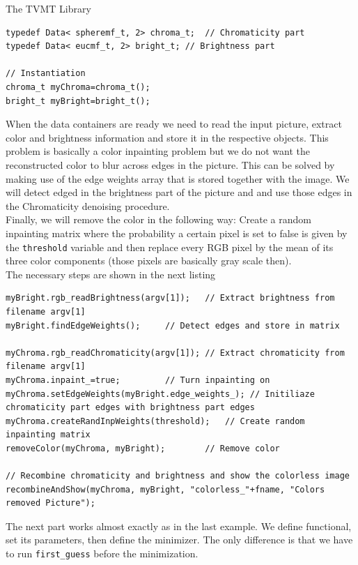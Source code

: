 \begin{chapter}{The TVMT Library}
\begin{lstlisting}[label=code:tut2_mfdata,caption={Manifold and Data class type definitions and instantiation}]
typedef Data< spheremf_t, 2> chroma_t;	// Chromaticity part
typedef Data< eucmf_t, 2> bright_t;	// Brightness part

// Instantiation
chroma_t myChroma=chroma_t();
bright_t myBright=bright_t();
\end{lstlisting}

When the data containers are ready we need to read the input picture, extract color and brightness information and store it in the respective objects.
This problem is basically a color inpainting problem but we do not want the reconstructed color to blur across edges in the picture. This can be solved
by making use of the edge weights array that is stored together with the image. We will detect edged in the brightness part of the picture and and
use those edges in the Chromaticity denoising procedure.\\
Finally, we will remove the color in the following way: Create a random inpainting matrix where the probability a certain pixel is set to false is given
by the \texttt{threshold} variable and then replace every RGB pixel by the mean of its three color components (those pixels are basically gray scale then).\\
The necessary steps are shown in the next listing

\cppinline
\begin{lstlisting}[label=code:tut2_edgeandcolorremoval,caption={Color and brightness input, edge detection and color removal}]
myBright.rgb_readBrightness(argv[1]);	// Extract brightness from filename argv[1]
myBright.findEdgeWeights();		// Detect edges and store in matrix

myChroma.rgb_readChromaticity(argv[1]); // Extract chromaticity from filename argv[1]
myChroma.inpaint_=true;			// Turn inpainting on
myChroma.setEdgeWeights(myBright.edge_weights_); // Initiliaze chromaticity part edges with brightness part edges
myChroma.createRandInpWeights(threshold);   // Create random inpainting matrix
removeColor(myChroma, myBright);	    // Remove color

// Recombine chromaticity and brightness and show the colorless image
recombineAndShow(myChroma, myBright, "colorless_"+fname, "Colors removed Picture");
\end{lstlisting}

The next part works almost exactly as in the last example. We define functional, set its parameters, then define the minimizer. The only difference is that
we have to run \texttt{first\_guess} before the minimization.\\


\end{chapter}
